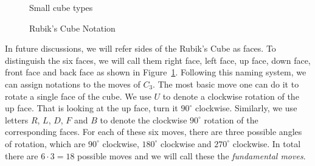 \begin{figure}[ht]
    \centering
    \begin{minipage}[b]{0.45\textwidth}
        \centering
        \setlength{\abovecaptionskip}{0.7cm}
        \caption{Small cube types}\label{fig:cube-type}
    \end{minipage}
    \begin{minipage}[b]{0.45\textwidth}
        \centering
        \caption{Rubik's Cube Notation}\label{fig:cube-notation}
    \end{minipage}
\end{figure}
\par In future discussions, we will refer sides of the Rubik's Cube as faces. To distinguish the six faces, we will call them right face, left face, up face, down face, front face and back face as shown in Figure~\ref{fig:cube-notation}. Following this naming system, we can assign notations to the moves of $C_3$. The most basic move one can do it to rotate a single face of the cube. We use $U$ to denote a clockwise rotation of the up face. That is looking at the up face, turn it $90^\circ$ clockwise. Similarly, we use letters $R$, $L$, $D$, $F$ and $B$ to denote the clockwise $90^\circ$ rotation of the corresponding faces. For each of these six moves, there are three possible angles of rotation, which are $90^\circ$ clockwise, $180^\circ$ clockwise and $270^\circ$ clockwise. In total there are $6 \cdot 3 = 18$ possible moves and we will call these the \textit{fundamental moves}.
